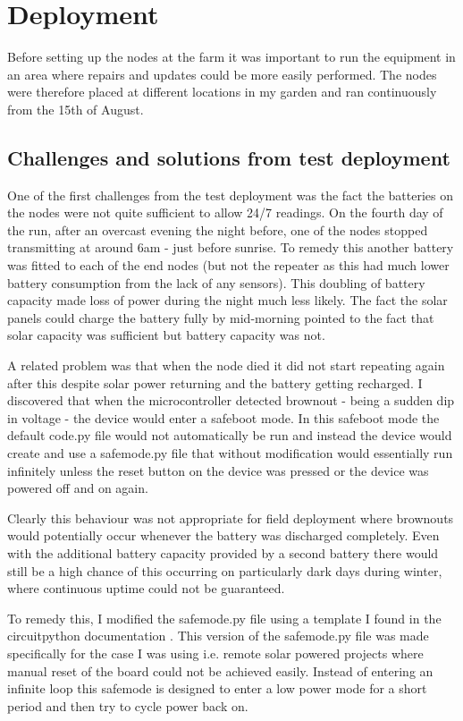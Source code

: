 \section{Deployment}\label{sec:deployment}

Before setting up the nodes at the farm it was important to run the equipment in
an area where repairs and updates could be more easily performed. The nodes were
therefore placed at different locations in my garden and ran continuously from
the 15th of August.

\subsection{Challenges and solutions from test deployment}

One of the first challenges from the test deployment was the fact the batteries
on the nodes were not quite sufficient to allow 24/7 readings. On the fourth day
of the run, after an overcast evening the night before, one of the nodes stopped
transmitting at around 6am - just before sunrise. To remedy this another battery
was fitted to each of the end nodes (but not the repeater as this had much lower
battery consumption from the lack of any sensors). This doubling of battery
capacity made loss of power during the night much less likely. The fact the
solar panels could charge the battery fully by mid-morning pointed to the fact
that solar capacity was sufficient but battery capacity was not.

A related problem was that when the node died it did not start repeating again
after this despite solar power returning and the battery getting recharged. I
discovered that when the microcontroller detected brownout - being a sudden dip
in voltage - the device would enter a safeboot mode. In this safeboot mode the
default code.py file would not automatically be run and instead the device would
create and use a safemode.py file that without modification would essentially
run infinitely unless the reset button on the device was pressed or the device
was powered off and on again.

Clearly this behaviour was not appropriate for field deployment where brownouts
would potentially occur whenever the battery was discharged completely. Even
with the additional battery capacity provided by a second battery there would
still be a high chance of this occurring on particularly dark days during
winter, where continuous uptime could not be guaranteed.

To remedy this, I modified the safemode.py file using a template I found in the
circuitpython documentation \cite{halbert2023safemode}. This version of the
safemode.py file was made specifically for the case I was using i.e. remote
solar powered projects where manual reset of the board could not be achieved
easily. Instead of entering an infinite loop this safemode is designed to enter
a low power mode for a short period and then try to cycle power back on.

